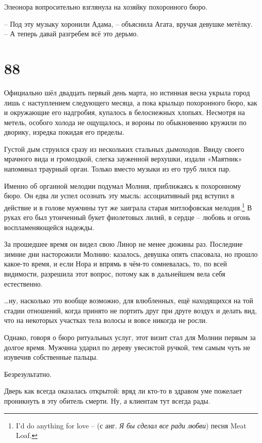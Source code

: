 \documentclass[
  a5paperpaper,
  DIV=11,
  numbers=noendperiod]{scrreprt}
\begin{document}
Элеонора вопросительно взглянула на хозяйку похоронного бюро.

-- Под эту музыку хоронили Адама, -- объяснила Агата, вручая девушке
метёлку. -- А теперь давай разгребем всё это дерьмо.

\section*{88}\label{88}


Официально шёл двадцать первый день марта, но истинная весна укрыла
город лишь с наступлением следующего месяца, а пока крыльцо похоронного
бюро, как и окружающие его надгробия, купалось в белоснежных хлопьях.
Несмотря на метель, особого холода не ощущалось, и вороны по обыкновению
кружили по дворику, изредка покидая его пределы.

Густой дым струился сразу из нескольких стальных дымоходов. Ввиду своего
мрачного вида и громоздкой, слегка зауженной верхушки, издали «Маятник»
напоминал траурный орган. Только вместо музыки из его труб лился пар.

Именно об органной мелодии подумал Молния, приближаясь к похоронному
бюро. Он едва ли успел осознать эту мысль: ассоциативный ряд вступил в
действие и в голове мужчины тут же заиграла старая митлофовская
мелодия.\footnote{I'd do anything for love -- (с анг. \emph{Я бы сделал
  все ради любви}) песня Meat Loaf.} В руках его был утонченный букет
фиолетовых лилий, в сердце -- любовь и огонь воспламеняющейся надежды.

За прошедшее время он видел свою Линор не менее дюжины раз. Последние
зимние дни насторожили Молнию: казалось, девушка опять спасовала, но
прошло какое-то время, и если Нора и впрямь в чём-то сомневалась, то, по
всей видимости, разрешила этот вопрос, потому как в дальнейшем вела себя
естественно.

\ldots ну, насколько это вообще возможно, для влюбленных, ещё
находящихся на той стадии отношений, когда принято не портить друг при
друге воздух и делать вид, что на некоторых участках тела волосы и вовсе
никогда не росли.

Однако, говоря о бюро ритуальных услуг, этот визит стал для Молнии
первым за долгое время. Мужчина ударил по дереву увесистой ручкой, тем
самым чуть не изувечив собственные пальцы.

Безрезультатно.

Дверь как всегда оказалась открытой: вряд ли кто-то в здравом уме
пожелает проникнуть в эту обитель смерти. Ну, а клиентам тут всегда
рады.
\end{document}
